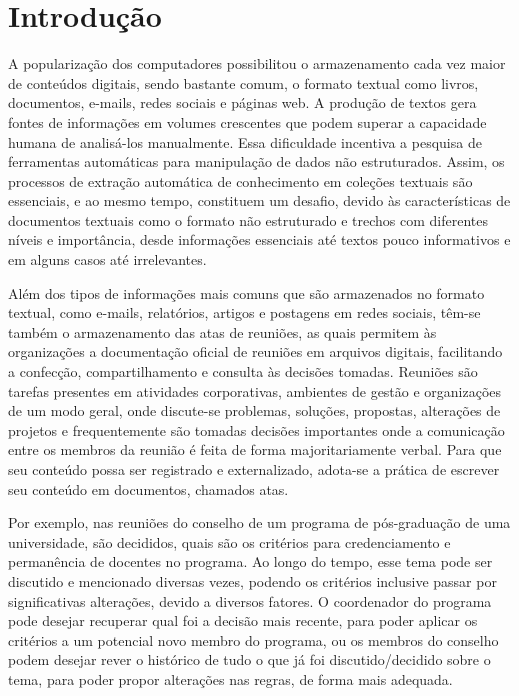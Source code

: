 \chapter{Introdução}\label{chap:introducao}


A popularização dos computadores possibilitou o armazenamento cada vez maior de conteúdos digitais, sendo bastante comum, o formato textual como livros, documentos, e-mails, redes sociais e páginas web. A produção de textos gera fontes de informações em volumes crescentes que podem superar a capacidade humana de analisá-los manualmente. Essa dificuldade incentiva a pesquisa de ferramentas automáticas para manipulação de dados não estruturados. Assim, os processos de extração automática de conhecimento em coleções textuais são essenciais, e ao mesmo tempo, constituem um desafio, devido às características de documentos textuais como o formato não estruturado e trechos com diferentes níveis e importância, desde informações essenciais até textos pouco informativos e em alguns casos até irrelevantes. 

Além dos tipos de informações mais comuns que são armazenados no formato textual, como e-mails, relatórios, artigos e postagens em redes sociais, têm-se também o armazenamento das atas de reuniões, as quais permitem às organizações a documentação oficial de reuniões em arquivos digitais, facilitando a confecção, compartilhamento e consulta às decisões tomadas.
% 
% 
% 
Reuniões são tarefas presentes em atividades corporativas, ambientes de gestão e organizações de um modo geral, onde discute-se problemas, soluções, propostas, alterações de projetos e frequentemente são tomadas decisões importantes onde a comunicação entre os membros da reunião é feita de forma majoritariamente verbal. Para que seu conteúdo possa ser registrado e externalizado, adota-se a prática de escrever seu conteúdo em documentos, chamados atas. 

Por exemplo, nas reuniões do conselho de um programa de pós-graduação de uma universidade, são decididos, quais são os critérios para credenciamento e permanência de docentes no programa. Ao longo do tempo, esse tema pode ser discutido e mencionado diversas vezes, podendo os critérios inclusive passar por significativas alterações, devido a diversos fatores. O coordenador do programa pode desejar recuperar qual foi a decisão mais recente, para poder aplicar os critérios a um potencial novo membro do programa, ou os membros do conselho podem desejar rever o histórico de tudo o que já foi discutido/decidido sobre o tema, para poder propor alterações nas regras, de forma mais adequada.

